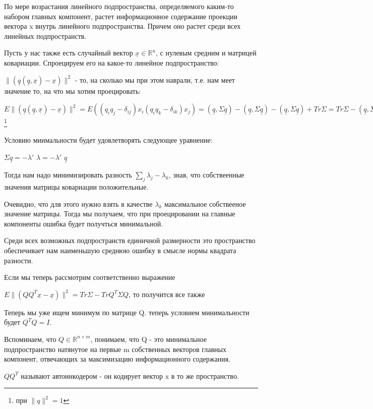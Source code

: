 \documentclass[a4paper, 12pt]{article}
\begin{document}
	По мере возрастания линейного подпространства, определяемого каким-то набором главных компонент, растет информационное содержание проекции вектора x  внутрь линейного подпространства. Причем оно растет среди всех линейных подпространств. 
	
	Пусть у нас также есть случайный вектор $\underline{x} \in \mathbb {R}^n$, с нулевым средним и матрицей ковариации. Спроецируем его на какое-то линейное подпространство:
	
	$\|(\underline{q}(\underline{q},\underline{x}) - \underline{x})\|^2$ - то, на сколько мы при этом наврали, т.е. нам меет значение то, на что мы хотим проецировать:
	
	$E\|(\underline{q}(\underline{q},\underline{x}) - \underline{x})\|^2 = E((q_iq_j - \delta_{ij})x_i(q_iq_k - \delta_{ik})x_j) = (\underline{q}, \Sigma\underline{q}) - (\underline{q}, \Sigma\underline{q}) - (\underline{q}, \Sigma\underline{q}) + Tr \Sigma = Tr \Sigma - (\underline{q}, \Sigma\underline{q}) \rightarrow min$\footnote{при $\|q\|^2=1$}
	
	Условию миимальности будет удовлетворять следующее уравнение:
	
	$\Sigma \underline{q} = -\lambda ' $
	$\lambda = - \lambda '$ $\underline{q}$
	
	Тогда нам надо минимизировать разность $\sum_{j} \lambda_j - \lambda_k$, зная, что собствеенные значения матрицы ковариации положительные.
	
	Очевидно, что для этого нужно взять в качестве $\lambda_k$ максимальное собствееное значение матрицы. Тогда мы получаем, что при проецировании на главные компоненты ошибка будет получться минимальной. 
	
	Среди всех возможных подпространств единичной размерности это пространство обеспечивает нам наименьшую среднюю ошибку в смысле нормы квадрата разности.
	
	Если мы теперь рассмотрим соответственно выражение 
	
	$E\|(QQ^T\underline{x} - \underline{x})\|^2 = Tr \Sigma - Tr Q^T \Sigma Q$, то получится все также 
	
	Теперь мы уже ищем минимум по матрице Q. теперь условием минимальности будет $Q^TQ=I$.
	
	Вспоминаем, что $Q \in  \mathbb {R}^{n\times m}$, понимаем, что Q - это минимальное подпространство натянутое на первые m собственных векторов главных компонент, отвечающих за максимизацию информационного содержания. 
	
	$QQ^T$ называют автоинкодером - он кодирует вектор x  в то же пространство.
	
\end{document}
